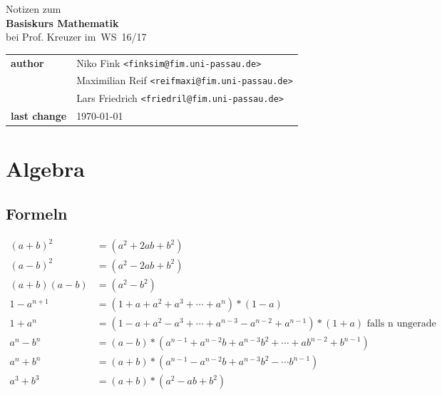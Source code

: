 \documentclass[a4paper,10pt]{article}
\begin{document}
\begin{titlepage}
	\begin{center}
		\huge Notizen zum \\
		\Huge \textbf{Basiskurs Mathematik} \\
		\huge bei Prof. Kreuzer im WS 16/17 \\
		\normalsize

		\vspace{1cm}
		\begin{tabular}[b]{l|l}
			\textbf{author} & Niko Fink \texttt{<finksim@fim.uni-passau.de>} \\
							& Maximilian Reif \texttt{<reifmaxi@fim.uni-passau.de>} \\
							& Lars Friedrich \texttt{<friedril@fim.uni-passau.de>} \\
			\textbf{last change} & \today
		\end{tabular}

		\vspace{1cm}
		\tableofcontents
	\end{center}
\end{titlepage}

\section{Algebra}

\subsection{Formeln}
\begin{align}
(a+b)^2 &= (a^2 + 2ab + b^2) \tag{1. binomische Formel} \\
(a-b)^2 &= (a^2 - 2ab + b^2) \tag{2. binomische Formel} \\
(a+b)(a-b) &= (a^2 - b^2) \tag{3. binomische Formel} \\
1-a^{n+1} &= (1 + a + a^2 + a^3 + \cdots + a^n) * (1-a) \tag{Teleskopsumme} \\
1+a^{n}   &= (1 - a + a^2 - a^3 + \cdots + a^{n-3} - a^{n-2} + a^{n-1}) * (1+a) \text{ falls n ungerade} \tag{Teleskopsumme2} \\
a^n - b^n &= (a-b) * (a^{n-1} + a^{n-2} b + a^{n-3} b^2 + \cdots + ab^{n-2} +b^{n-1}) \\
a^n + b^n &= (a+b) * (a^{n-1} - a^{n-2} b + a^{n-3} b^2 - \cdots b^{n-1}) \\
a^3 + b^3 &= (a+b) * (a^2 - ab + b^2)
\end{align}
\end{document}
